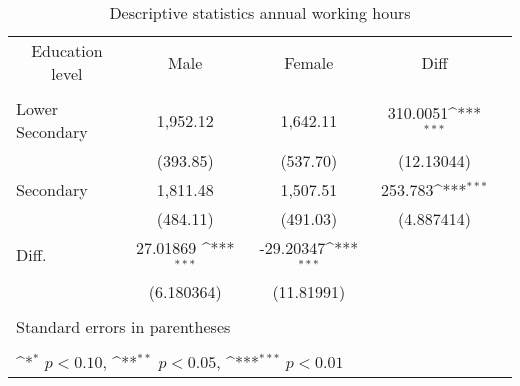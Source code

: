 \begin{table}[htbp]\centering
    \def\sym#1{\ifmmode^{#1}\else\(^{#1}\)\fi}
    \caption{\label{Tab:desc-1b}Descriptive statistics annual working hours}
    \begin{tabular}{l*{4}{c}}
        \hline
        \multicolumn{1}{c}{Education level}   &\multicolumn{1}{c}{Male}&\multicolumn{1}{c}{Female}&\multicolumn{1}{c}{Diff}\\
        \\
        \hline
            Lower Secondary & 1,952.12      & 1,642.11& 310.0051\sym{***}  \\
                            & (393.85)      & (537.70)& (12.13044)  \\
            Secondary       &  1,811.48     & 1,507.51& 253.783\sym{***}      \\
                            & (484.11)      & (491.03)& (4.887414)    \\
            Diff.           &       27.01869 \sym{***}   & -29.20347\sym{***}\\
                            &       (6.180364)  &   (11.81991)  \\
        \\                    
        \hline
        \multicolumn{3}{l}{\footnotesize Standard errors in parentheses}\\
        \multicolumn{3}{l}{\footnotesize }\\
        \multicolumn{3}{l}{\footnotesize \sym{*} \(p<0.10\), \sym{**} \(p<0.05\), \sym{***} \(p<0.01\)}\\


    \end{tabular}
\end{table}
